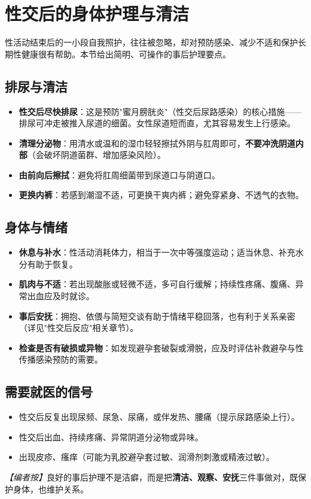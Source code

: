 \section{性交后的身体护理与清洁}

性活动结束后的一小段自我照护，往往被忽略，却对预防感染、减少不适和保护长期性健康很有帮助。本节给出简明、可操作的事后护理要点。

\subsection{排尿与清洁}

\begin{itemize}
	\item \textbf{性交后尽快排尿}：这是预防"蜜月膀胱炎"（性交后尿路感染）的核心措施——排尿可冲走被推入尿道的细菌。女性尿道短而直，尤其容易发生上行感染。
	\item \textbf{清理分泌物}：用清水或温和的湿巾轻轻擦拭外阴与肛周即可，\textbf{不要冲洗阴道内部}（会破坏阴道菌群、增加感染风险）。
	\item \textbf{由前向后擦拭}：避免将肛周细菌带到尿道口与阴道口。
	\item \textbf{更换内裤}：若感到潮湿不适，可更换干爽内裤；避免穿紧身、不透气的衣物。
\end{itemize}

\subsection{身体与情绪}

\begin{itemize}
	\item \textbf{休息与补水}：性活动消耗体力，相当于一次中等强度运动；适当休息、补充水分有助于恢复。
	\item \textbf{肌肉与不适}：若出现酸胀或轻微不适，多可自行缓解；持续性疼痛、腹痛、异常出血应及时就诊。
	\item \textbf{事后安抚}：拥抱、依偎与简短交谈有助于情绪平稳回落，也有利于关系亲密（详见"性交后反应"相关章节）。
	\item \textbf{检查是否有破损或异物}：如发现避孕套破裂或滑脱，应及时评估补救避孕与性传播感染预防的需要。
\end{itemize}

\subsection{需要就医的信号}

\begin{itemize}
	\item 性交后反复出现尿频、尿急、尿痛，或伴发热、腰痛（提示尿路感染上行）。
	\item 性交后出血、持续疼痛、异常阴道分泌物或异味。
	\item 出现皮疹、瘙痒（可能为乳胶避孕套过敏、润滑剂刺激或精液过敏）。
\end{itemize}

\noindent\textit{【编者按】}良好的事后护理不是洁癖，而是把\textbf{清洁、观察、安抚}三件事做对，既保护身体，也维护关系。
